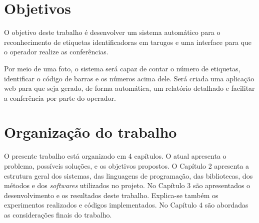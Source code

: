 \section{Objetivos} 

O objetivo deste trabalho é desenvolver um sistema automático para o reconhecimento de etiquetas identificadoras em tarugos e uma interface para que o operador realize as conferências. 

Por meio de uma foto, o sistema será capaz de contar o número de etiquetas, identificar o código de barras e os números acima dele. Será criada uma aplicação web para que seja gerado, de forma automática, um relatório detalhado e facilitar a conferência por parte do operador.

\section{Organização do trabalho}

O presente trabalho está organizado em 4 capítulos. O atual apresenta o problema, possíveis soluções, e os objetivos propostos.
%
O Capítulo 2 apresenta a estrutura geral dos sistemas, das linguagens de programação, das bibliotecas, dos métodos e dos \textit{softwares} utilizados no projeto.
%
No Capítulo 3 são apresentados o desenvolvimento e os resultados deste trabalho. Explica-se também os experimentos realizados e códigos implementados.
%
No Capítulo 4 são abordadas as considerações finais do trabalho.